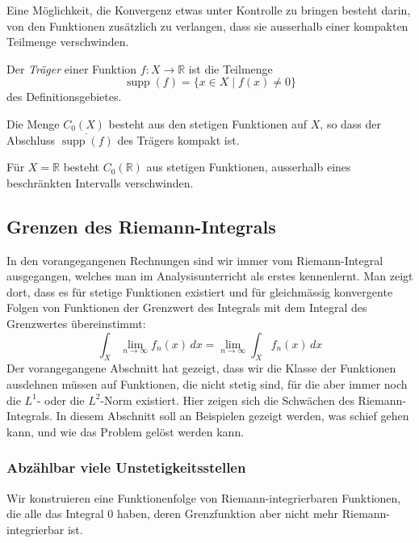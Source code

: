 Eine Möglichkeit, die Konvergenz etwas unter Kontrolle zu bringen
besteht darin, von den Funktionen zusätzlich zu verlangen, dass sie
ausserhalb einer kompakten Teilmenge verschwinden.

\begin{definition}[Träger]
Der {\em Träger} einer Funktion $f\colon X\to\mathbb{R}$ ist die Teilmenge
\[
\operatorname{supp}(f)
=
\{x\in X\mid f(x)\ne 0\}
\]
des Definitionsgebietes.
%
\end{definition}

\begin{definition}
Die Menge $C_0(X)$ besteht aus den stetigen Funktionen auf $X$,
so dass der Abschluss $\overline{\operatorname{supp}(f)}$ des Trägers
kompakt ist.
\end{definition}

Für $X=\mathbb{R}$ besteht $C_0(\mathbb{R})$ aus stetigen Funktionen,
ausserhalb eines beschränkten Intervalls verschwinden.

%
%
\subsection{Grenzen des Riemann-Integrals
\label{buch:skalarprodukt:funktionenraeume:subsection:grenzen-riemann}}
In den vorangegangenen Rechnungen sind wir immer vom Riemann-Integral
ausgegangen, welches man im Analysisunterricht als erstes kennenlernt.
Man zeigt dort, dass es für stetige Funktionen existiert und für
gleichmässig konvergente Folgen von Funktionen der Grenzwert des
Integrals mit dem Integral des Grenzwertes übereinstimmt:
\[
\int_X \lim_{n\to\infty} f_n(x)\,dx
=
\lim_{n\to\infty}
\int_X f_n(x)\,dx
\]
Der vorangegangene Abschnitt hat gezeigt, dass wir die Klasse der
Funktionen ausdehnen müssen auf Funktionen, die nicht stetig sind,
für die aber immer noch die $L^1$- oder die $L^2$-Norm existiert.
Hier zeigen sich die Schwächen des Riemann-Integrals.
In diesem Abschnitt soll an Beispielen gezeigt werden, was schief
gehen kann, und wie das Problem gelöst werden kann.

%
%
\subsubsection{Abzählbar viele Unstetigkeitsstellen}
Wir konstruieren eine Funktionenfolge von Riemann-integrierbaren 
Funktionen, die alle das Integral $0$ haben, deren Grenzfunktion
aber nicht mehr Riemann-integrierbar ist.

